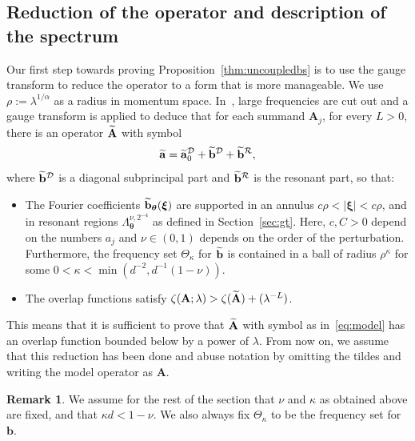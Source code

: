\documentclass[10pt]{amsart}
\theoremstyle{definition}\newtheorem{defi}[theo]{Definition}\newtheorem{rema}[theo]{Remark}\newtheorem{exam}[theo]{Example}\newtheorem{nota}[theo]{Notation}
\newcommand{\CD}{\mathcal{D}}
\newcommand{\CR}{\mathcal{R}}
\newcommand{\btheta}{\boldsymbol \theta}
\newcommand{\bxi}{\boldsymbol \xi}
\newcommand{\ba}{\mathbf a}
\newcommand{\BA}{\mathbf A}
\newcommand{\bbb}{\mathbf b}
\newcommand{\abs}[1]{\left\lvert #1 \right\rvert}
\let\oldtilde\tilde
\renewcommand*{\tilde}[1]{\mathchoice{\widetilde{#1}}{\widetilde{#1}}{\oldtilde{#1}}{\oldtilde{#1}}}
\begin{document}
\subsection{Reduction of the operator and description of the spectrum} \label{sec:constr}

Our first step towards proving Proposition~\ref{thm:uncoupledbs} is to use the gauge transform to reduce the operator to a form that is more manageable. We use $\rho := \lambda^{1/\alpha}$ as a radius in momentum space. In~\cite[Theorem~4.3 and Lemma~10.4]{ParSob2010}, large frequencies are cut out and a gauge transform is applied to deduce that for each summand $\BA_j$, for every $L > 0$, there is an operator $\tilde \BA$ with symbol
\begin{equation}\label{eq:model}
\tilde \ba =
\tilde \ba_0^\CD + \tilde\bbb^\CD + \tilde \bbb^\CR,
\end{equation}
where $\tilde \bbb^\CD$ is a diagonal subprincipal part and $\tilde \bbb^\CR$ is the resonant part, so that:
\begin{itemize}
\item The Fourier coefficients $\tilde \bbb_{\btheta}(\bxi)$ are supported in an annulus $c \rho < \abs \bxi < c\rho$, and in resonant regions $\Lambda_{\btheta}^{\nu,2^{-4}}$ as defined in Section~\ref{sec:gt}. Here, $c,C > 0$ depend on the numbers $a_j$ and $\nu \in (0,1)$ depends on the order of the perturbation. Furthermore, the frequency set $\Theta_\kappa$ for $\tilde \bbb$ is contained in a ball of radius $\rho^\kappa$ for some $0 < \kappa <
\min(d^{-2},d^{-1}(1 -\nu))$.
\item The overlap functions satisfy $\zeta(\BA;\lambda) > \zeta(\tilde \BA) + (\lambda^{-L})$.
\end{itemize}
This means that it is sufficient to prove that $\tilde \BA$ with symbol as in~\eqref{eq:model} has an overlap function bounded below by a power of $\lambda$. From now on, we assume that this reduction has been done and abuse notation by omitting the tildes and writing the model operator as $\BA$.

\begin{rema}\label{rmk:kappanufixed}
We assume for the rest of the section that $\nu$ and $\kappa$ as obtained above are fixed, and that $\kappa d < 1 - \nu$. We also always fix $\Theta_\kappa$ to be the frequency set for $\bbb$.
\end{rema}
\end{document}
